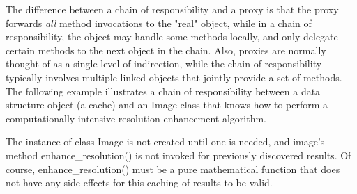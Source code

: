 The difference between a chain of responsibility and a proxy is that the
proxy forwards \textit{all} method invocations to the
"real" object, while in a chain of
responsibility, the object may handle some methods locally, and only
delegate certain methods to the next object in the chain. Also, proxies
are normally thought of as a single level of indirection, while the
chain of responsibility typically involves multiple linked objects that
jointly provide a set of methods. The following example illustrates a
chain of responsibility between a data structure object (a cache) and
an \textsf{Image} class that knows how to perform a computationally
intensive resolution enhancement algorithm.


The instance of class Image is not created until one is needed, and
image's method \textsf{enhance\_resolution()} is not
invoked for previously discovered results. Of course,
\textsf{enhance\_resolution()} must be a pure mathematical function
that does not have any side effects for this caching of results to be
valid.

